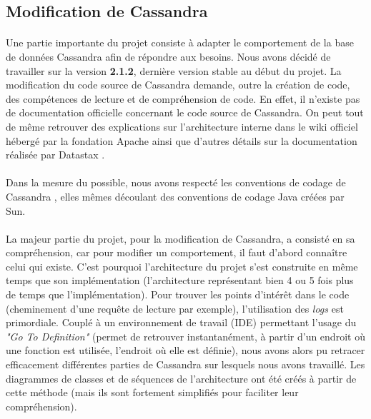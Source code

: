 \documentclass[12pt]{article}
\begin{document}
\subsection{Modification de Cassandra}

\paragraph{}Une partie importante du projet consiste à adapter le comportement de la base de données Cassandra afin de répondre aux besoins. Nous avons décidé de travailler sur la version \textbf{2.1.2}, dernière version stable au début du projet. La modification du code source de Cassandra demande, outre la création de code, des compétences de lecture et de compréhension de code. En effet, il n'existe pas de documentation officielle concernant le code source de Cassandra. On peut tout de même retrouver des explications sur l'architecture interne dans le wiki officiel hébergé par la fondation Apache \cite{CassArchi13} ainsi que d'autres détails sur la documentation réalisée par Datastax \cite{DatastaxDoc15}.

\paragraph{}Dans la mesure du possible, nous avons respecté les conventions de codage de Cassandra \cite{CassCodeStyle14}, elles mêmes découlant des conventions de codage Java créées par Sun.

\paragraph{}La majeur partie du projet, pour la modification de Cassandra, a consisté en sa compréhension, car pour modifier un comportement, il faut d'abord connaître celui qui existe. C'est pourquoi l'architecture du projet s'est construite en même temps que son implémentation (l'architecture représentant bien 4 ou 5 fois plus de temps que l'implémentation). Pour trouver les points d'intérêt dans le code (cheminement d'une requête de lecture par exemple), l'utilisation des \textit{logs} est primordiale. Couplé à un environnement de travail (IDE) permettant l'usage du \textit{"Go To Definition"} (permet de retrouver instantanément, à partir d'un endroit où une fonction est utilisée, l'endroit où elle est définie), nous avons alors pu retracer efficacement différentes parties de Cassandra sur lesquels nous avons travaillé. Les diagrammes de classes et de séquences de l'architecture ont été créés à partir de cette méthode (mais ils sont fortement simplifiés pour faciliter leur compréhension).
\end{document}
